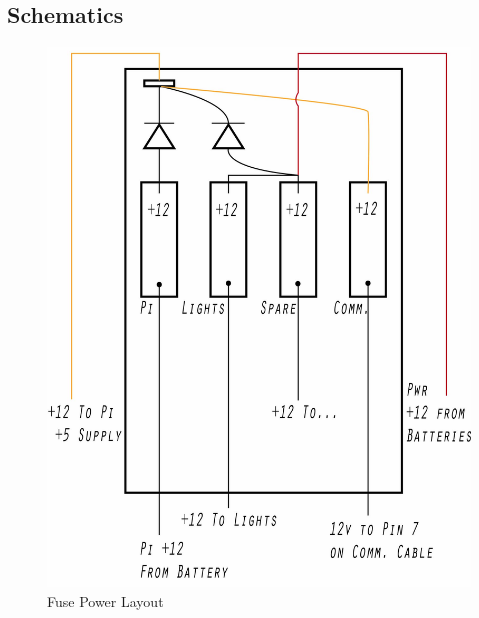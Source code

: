 \documentclass[
18pt, %
a4paper, %
oneside, %
headinclude,footinclude, %
]{scrartcl}
\begin{document}

\subsection{Schematics}

\begin{figure}[H]
	\centering 
	\hspace*{-2cm}
	\includegraphics[width=1.1\columnwidth]{Figures/Component_Diagrams/fuse_schematic.jpg}
	\caption[]{Fuse Power Layout} %
\end{figure}
\end{document}
